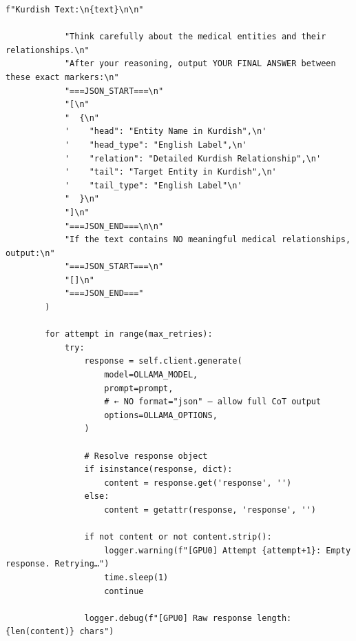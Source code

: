 \documentclass[11pt]{article}
\begin{document}
\begin{lstlisting}[style=pythoncode, caption={kg\_generator\_gpu\_0.py}]
            f"Kurdish Text:\n{text}\n\n"

            "Think carefully about the medical entities and their relationships.\n"
            "After your reasoning, output YOUR FINAL ANSWER between these exact markers:\n"
            "===JSON_START===\n"
            "[\n"
            "  {\n"
            '    "head": "Entity Name in Kurdish",\n'
            '    "head_type": "English Label",\n'
            '    "relation": "Detailed Kurdish Relationship",\n'
            '    "tail": "Target Entity in Kurdish",\n'
            '    "tail_type": "English Label"\n'
            "  }\n"
            "]\n"
            "===JSON_END===\n\n"
            "If the text contains NO meaningful medical relationships, output:\n"
            "===JSON_START===\n"
            "[]\n"
            "===JSON_END==="
        )

        for attempt in range(max_retries):
            try:
                response = self.client.generate(
                    model=OLLAMA_MODEL,
                    prompt=prompt,
                    # ← NO format="json" — allow full CoT output
                    options=OLLAMA_OPTIONS,
                )

                # Resolve response object
                if isinstance(response, dict):
                    content = response.get('response', '')
                else:
                    content = getattr(response, 'response', '')

                if not content or not content.strip():
                    logger.warning(f"[GPU0] Attempt {attempt+1}: Empty response. Retrying…")
                    time.sleep(1)
                    continue

                logger.debug(f"[GPU0] Raw response length: {len(content)} chars")


\end{lstlisting}
\end{document}
